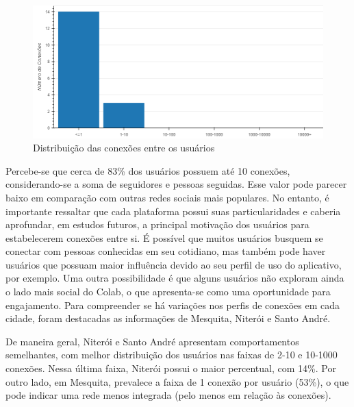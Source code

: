 \begin{figure}[!htb]
	\caption{Distribuição das conexões entre os usuários}
	\label{fig:colab_users_by_connection}
	\centering
	\includegraphics[scale=0.7]{images/colab_users_by_connection.png}
\end{figure}

Percebe-se que cerca de 83\% dos usuários possuem até 10 conexões, considerando-se a soma de seguidores e pessoas seguidas. Esse valor pode parecer baixo em comparação com outras redes sociais mais populares. No entanto, é importante ressaltar que cada plataforma possui suas particularidades e caberia aprofundar, em estudos futuros, a principal motivação dos usuários para estabelecerem conexões entre si. É possível que muitos usuários busquem se conectar com pessoas conhecidas em seu cotidiano, mas também pode haver usuários que possuam maior influência devido ao seu perfil de uso do aplicativo, por exemplo. Uma outra possibilidade é que alguns usuários não exploram ainda o lado mais social do Colab, o que apresenta-se como uma oportunidade para engajamento. Para compreender se há variações nos perfis de conexões em cada cidade, foram destacadas as informações de Mesquita, Niterói e Santo André.

De maneira geral, Niterói e Santo André apresentam comportamentos semelhantes, com melhor distribuição dos usuários nas faixas de 2-10 e 10-1000 conexões. Nessa última faixa, Niterói possui o maior percentual, com 14\%. Por outro lado, em Mesquita, prevalece a faixa de 1 conexão por usuário (53\%), o que pode indicar uma rede menos integrada (pelo menos em relação às conexões).

